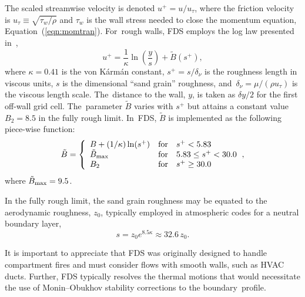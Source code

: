 \documentclass[atmosphere,article,accept,moreauthors,pdftex]{Definitions/mdpi}
\begin{document}
The scaled streamwise velocity is denoted $u^+ = u/u_\tau$, where the friction velocity is $u_\tau \equiv \sqrt{\tau_w/\rho}$ and $\tau_w$ is the wall stress needed to close the momentum equation, \mbox{Equation~(\ref{eqn:momtran})}.  For~rough walls, FDS employs the log law presented in~\cite{Pope:2000},
\begin{equation}
\label{eqn_roughwallloglaw}
u^+ = \frac{1}{\kappa} \ln \left(\frac{y}{s}\right) + \tilde{B}(s^+),
\end{equation}
where $\kappa = 0.41$ is the von K\'arm\'an constant, $s^+ = s/\delta_\nu$ is the roughness length in viscous units, $s$ is the dimensional ``sand grain'' roughness, and~$\delta_\nu = \mu/(\rho u_\tau)$ is the viscous length scale. The~distance to the wall, $y$, is taken as $\delta y/2$ for the first off-wall grid cell.  The~parameter $\tilde{B}$ varies with $s^+$ but attains a constant value $B_2=8.5$ in the fully rough limit.  In~FDS, $\tilde{B}$ is implemented as the following piece-wise function:
\begin{equation}
\tilde{B} = \left\{ \begin{array}{lll} B + (1/\kappa)\ln(s^+) & \mbox{for} & s^+ < 5.83 \\
\tilde{B}_{\rm max} & \mbox{for} & 5.83 \le s^+ < 30.0 \\
B_2 & \mbox{for} & s^+ \ge 30.0 \end{array} \right.,
\end{equation}
where $\tilde{B}_{\rm max} = 9.5$.

In the fully rough limit, the sand grain roughness may be equated to the aerodynamic roughness, $z_0$, typically employed in atmospheric codes for a neutral boundary layer,
\begin{equation}
s = z_0 e^{8.5 \kappa} \approx 32.6 \, z_0.
\end{equation}

It is important to appreciate that FDS was originally designed to handle compartment fires and must consider flows with smooth walls, such as HVAC ducts.  Further, FDS typically resolves the thermal motions that would necessitate the use of Monin–Obukhov stability corrections to the boundary~profile.
\end{document}
